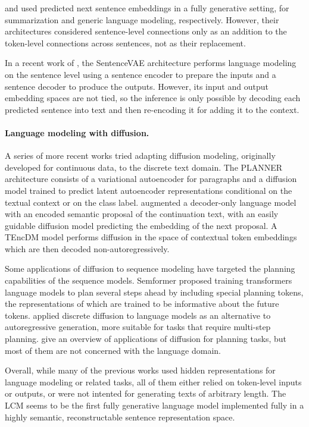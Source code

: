 \documentclass[twoside,11pt]{fairmeta}
\newcommand{\lcm}{\textsc{LCM}\xspace}
\begin{document}
\citet{newsum:acl:2021} and \cite{cornille2024learning} used predicted next sentence embeddings in a fully generative setting, for summarization and generic language modeling, respectively. However, their architectures considered sentence-level connections only as an addition to the token-level connections across sentences, not as their replacement. 

In a recent work of \citet{an2024sentencevae}, the SentenceVAE architecture performs language modeling on the sentence level using a sentence encoder to prepare the inputs and a sentence decoder to produce the outputs. However, its input and output embedding spaces are not tied, so the inference is only possible by decoding each predicted sentence into text and then re-encoding it for adding it to the context.

\paragraph{Language modeling with diffusion.} A series of more recent works tried adapting diffusion modeling, originally developed for continuous data, to the discrete text domain. The PLANNER architecture \citep{planner:neurips:2023} consists of a variational autoencoder for paragraphs and a diffusion model trained to predict latent autoencoder representations conditional on the textual context or on the class label. \citet{diffguidlm:arxiv:2024} augmented a decoder-only language model with an encoded semantic proposal of the continuation text, with an easily guidable diffusion model predicting the embedding of the next proposal. A TEncDM model \citep{tencdm:arxiv:2024} performs diffusion in the space of contextual token embeddings which are then decoded non-autoregressively.

Some applications of diffusion to sequence modeling have targeted the planning capabilities of the sequence models. Semformer \citep{semformer:arxiv:2024} proposed training transformers language models to plan several steps ahead by including special planning tokens, the representations of which are trained to be informative about the future tokens. \citet{discdiff-reason:arxiv:2024} applied discrete diffusion to language models as an alternative to autoregressive generation, more suitable for tasks that require multi-step planning. \citet{diffplan:arxiv:2024} give an overview of applications of diffusion for planning tasks, but most of them are not concerned with the language domain.

Overall, while many of the previous works used hidden representations for language modeling or related tasks, all of them either relied on token-level inputs or outputs, or were not intented for generating texts of arbitrary length. The \lcm seems to be the first fully generative language model implemented fully in a highly semantic, reconstructable sentence representation space.
\end{document}
